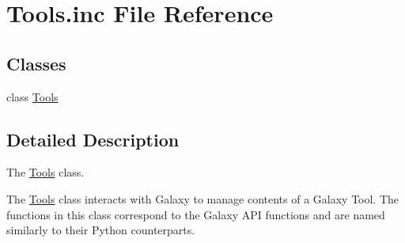 \hypertarget{Tools_8inc}{}\section{Tools.\+inc File Reference}
\label{Tools_8inc}
\subsection*{Classes}
\begin{DoxyCompactItemize}
\item 
class \hyperlink{classTools}{Tools}
\end{DoxyCompactItemize}


\subsection{Detailed Description}
The \hyperlink{classTools}{Tools} class.

The \hyperlink{classTools}{Tools} class interacts with Galaxy to manage contents of a Galaxy Tool. The functions in this class correspond to the Galaxy A\+PI functions and are named similarly to their Python counterparts. 
